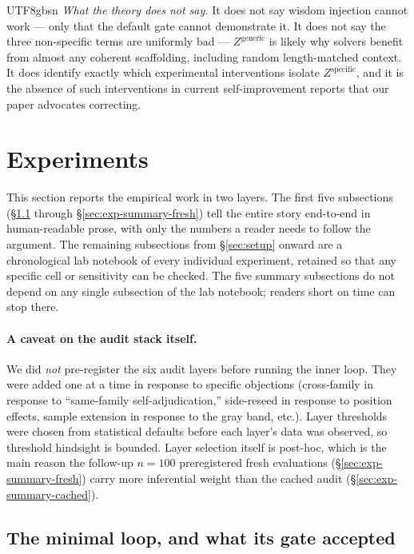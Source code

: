 \documentclass{article}
\begin{document}
\begin{CJK*}{UTF8}{gbsn}
\emph{What the theory does not say.} It does not say wisdom
injection cannot work — only that the default gate cannot
demonstrate it. It does not say the three non-specific terms are
uniformly bad — \(Z^{\mathrm{generic}}\) is likely why solvers
benefit from almost any coherent scaffolding, including random
length-matched context. It does identify exactly which
experimental interventions isolate \(Z^{\mathrm{specific}}\), and
it is the absence of such interventions in current self-improvement
reports that our paper advocates correcting.

\section{Experiments}
\label{sec:experiments}

This section reports the empirical work in two layers. The first
five subsections (\S\ref{sec:exp-summary-loop} through
\S\ref{sec:exp-summary-fresh}) tell the entire story end-to-end in
human-readable prose, with only the numbers a reader needs to
follow the argument. The remaining subsections from
\S\ref{sec:setup} onward are a chronological lab notebook of every
individual experiment, retained so that any specific cell or
sensitivity can be checked. The five summary subsections do not
depend on any single subsection of the lab notebook; readers
short on time can stop there.

\paragraph{A caveat on the audit stack itself.} We did
\emph{not} pre-register the six audit layers before running the
inner loop. They were added one at a time in response to specific
objections (cross-family in response to ``same-family
self-adjudication,'' side-reseed in response to position effects,
sample extension in response to the gray band, etc.). Layer
thresholds were chosen from statistical defaults before each
layer's data was observed, so threshold hindsight is bounded.
Layer selection itself is post-hoc, which is the main reason the
follow-up \(n=100\) preregistered fresh evaluations
(\S\ref{sec:exp-summary-fresh}) carry more inferential weight than
the cached audit (\S\ref{sec:exp-summary-cached}).

\subsection{The minimal loop, and what its gate accepted}
\label{sec:exp-summary-loop}


\end{CJK*}
\end{document}
